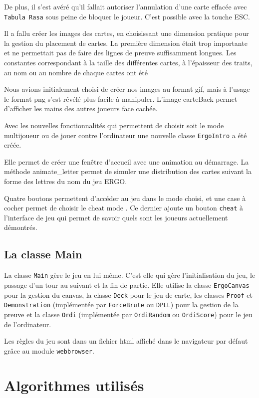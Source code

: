 \documentclass[12pt, algo]{cours}
\begin{document}
De plus, il s'est avéré qu'il fallait autoriser l'annulation d'une carte effacée avec \texttt{Tabula Rasa} sous peine de bloquer le joueur. C'est possible avec la touche ESC.

Il a fallu créer les images des cartes, en choisissant une dimension pratique pour la gestion du placement de cartes. La première dimension était trop importante et ne permettait pas de faire des lignes de preuve suffisamment longues. Les constantes correspondant à la taille des différentes cartes, à l'épaisseur des traits, au nom ou au nombre de chaque cartes ont été 

Nous avions initialement choisi de créer nos images au format gif, mais à l'usage le format png s'est révélé plus facile à manipuler. L'image carteBack permet d'afficher les mains des autres joueurs face cachée.

Avec les nouvelles fonctionnalités qui permettent de choisir soit le mode multijoueur ou de jouer contre l'ordinateur une nouvelle classe \texttt{ErgoIntro} a été créée. 

Elle permet de créer une fenêtre d’accueil avec une animation au démarrage. La méthode animate\_letter permet de simuler une distribution des cartes suivant la forme des lettres du nom du jeu ERGO.

Quatre boutons permettent d'accéder au jeu dans le mode choisi, et une case à cocher permet de choisir le \og cheat mode \fg. Ce dernier ajoute un bouton \texttt{cheat} à l'interface de jeu qui permet de savoir quels sont les joueurs actuellement démontrés.


\subsection{La classe Main}

La classe \texttt{Main} gère le jeu en lui même. C'est elle qui gère l'initialisation du jeu, le passage d'un tour au suivant et la fin de partie. Elle utilise la classe \texttt{ErgoCanvas} pour la gestion du canvas, la classe \texttt{Deck} pour le jeu de carte, les classes \texttt{Proof} et \texttt{Demonstration} (implémentée par \texttt{ForceBrute} ou \texttt{DPLL}) pour la gestion de la preuve et la classe \texttt{Ordi} (implémentée par \texttt{OrdiRandom} ou \texttt{OrdiScore}) pour le jeu de l'ordinateur. 

Les règles du jeu sont dans un fichier html affiché dans le navigateur par défaut grâce au module \texttt{webbrowser}.


\section{Algorithmes utilisés}
\end{document}
